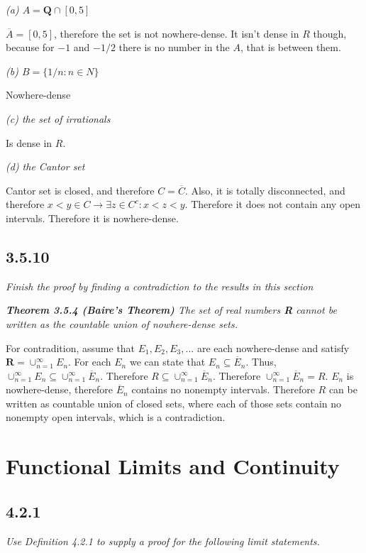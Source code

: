 \documentclass[11pt,oneside,titlepage]{book}
\begin{document}
\textit{(a) $A = \textbf{Q} \cap [0, 5]$}

$\overline A = [0, 5]$, therefore the set is not nowhere-dense. It isn't
dense in $R$ though, because for $-1$ and $-1/2$ there is no number in the
$A$, that is between them.

\textit{(b) $B = \{1/n: n \in N\}$}

Nowhere-dense

\textit{(c) the set of irrationals}

Is dense in $R$.

\textit{(d) the Cantor set}

Cantor set is closed, and therefore $C = \overline C$. Also, it is totally
disconnected, and therefore $x < y \in C \to \exists z \in C^c: x < z < y$.
Therefore it does not contain any open intervals. Therefore it
is nowhere-dense.

\section*{3.5.10}
\textit{Finish the proof by finding a contradiction to the results in this
  section}

\textit{\textbf{Theorem 3.5.4 (Baire's Theorem)} The set of real numbers
  \textbf{R} cannot be written as the countable union of nowhere-dense sets.}

For contradition, assume that $E_1, E_2, E_3, ... $ are each nowhere-dense and
satisfy $\textbf{R} = \cup_{n = 1}^{\infty} E_n$. For each $E_n$ we can state
that $E_n \subseteq \overline E_n$. Thus, $\cup_{n = 1}^{\infty} E_n \subseteq
\cup_{n = 1}^{\infty} \overline E_n$. Therefore
$R \subseteq \cup_{n = 1}^{\infty} \overline E_n$. Therefore
$\cup_{n = 1}^{\infty} \overline E_n = R$. $E_n$ is nowhere-dense, therefore
$\overline E_n$ contains no nonempty intervals. Therefore $R$ can be written as
countable union of closed sets, where each of those sets contain no nonempty
open intervals, which is a contradiction.

\chapter{Functional Limits and Continuity}

\section*{4.2.1}
\textit{Use Definition 4.2.1 to supply a proof for the following limit statements.}
\end{document}
